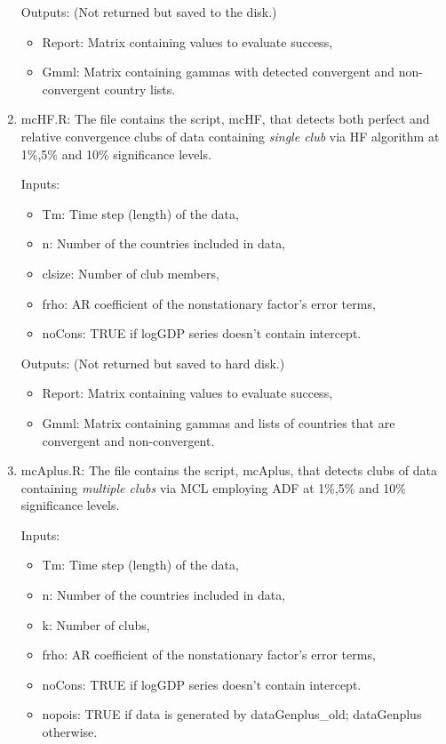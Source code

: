 \documentclass{article}
\begin{document}
\begin{enumerate}
		Outputs: (Not returned but saved to the disk.)
		
		\begin{itemize}
		\item Report: Matrix containing values to evaluate success,
		\item Gmml: Matrix containing gammas with detected convergent and non-convergent country lists.
		\end{itemize}		 	
		
	\item mcHF.R: The file contains the script, mcHF, that detects both perfect and relative convergence clubs of data containing \textit{single club} via HF algorithm at 1\%,5\% and 10\% significance levels.
	
	Inputs:
	\begin{itemize}
		
		\item Tm: Time step (length) of the data,
		\item n: Number of the countries included in data,
		\item clsize: Number of club members, 
		\item frho: AR coefficient of the nonstationary factor's error terms,
		\item noCons: TRUE if logGDP series doesn't contain intercept.
	\end{itemize}
	
	Outputs: (Not returned but saved to hard disk.)
	
	\begin{itemize}
		\item Report: Matrix containing values to evaluate success,
		\item Gmml: Matrix containing gammas and lists of countries that are convergent and non-convergent.
	\end{itemize}		 	
	
		\item mcAplus.R: The file contains the script, mcAplus, that detects clubs of data containing \textit{multiple clubs} via MCL employing ADF at 1\%,5\% and 10\% significance levels.
		
		Inputs:
		\begin{itemize}
			
			\item Tm: Time step (length) of the data,
			\item n: Number of the countries included in data,
			\item k: Number of clubs, 
			\item frho: AR coefficient of the nonstationary factor's error terms,
			\item noCons: TRUE if logGDP series doesn't contain intercept.
			\item nopois: TRUE if data is generated by dataGenplus\_old; dataGenplus otherwise.
		\end{itemize}
		

\end{enumerate}
\end{document}
